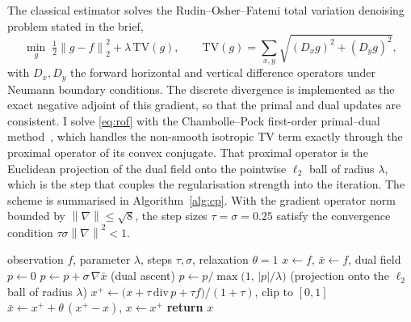 \documentclass[11pt,a4paper]{article}
\newcommand{\norm}[1]{\left\lVert #1 \right\rVert}
\begin{document}
The classical estimator solves the Rudin--Osher--Fatemi total variation
denoising problem stated in the brief,
\begin{equation}
  \min_{g}\; \tfrac12\norm{g-f}_2^2 + \lambda\,\mathrm{TV}(g),
  \qquad
  \mathrm{TV}(g)=\sum_{x,y}\sqrt{(D_xg)^2+(D_yg)^2},
  \label{eq:rof}
\end{equation}
with \(D_x,D_y\) the forward horizontal and vertical difference operators under
Neumann boundary conditions. The discrete divergence is implemented as the
exact negative adjoint of this gradient, so that the primal and dual updates are
consistent. I solve \eqref{eq:rof} with the Chambolle--Pock first-order
primal--dual method~\cite{chambollepock}, which handles the non-smooth isotropic
TV term exactly through the proximal operator of its convex conjugate. That
proximal operator is the Euclidean projection of the dual field onto the
pointwise \(\ell_2\) ball of radius \(\lambda\), which is the step that couples
the regularisation strength into the iteration. The scheme is summarised in
Algorithm~\ref{alg:cp}. With the gradient operator norm bounded by
\(\norm{\nabla}\le\sqrt{8}\), the step sizes \(\tau=\sigma=0.25\) satisfy the
convergence condition \(\tau\sigma\norm{\nabla}^2<1\).

\begin{algorithm}[H]
\caption{Chambolle--Pock TV denoising for problem~\eqref{eq:rof}}
\label{alg:cp}
\begin{algorithmic}[1]
\REQUIRE observation \(f\), parameter \(\lambda\), steps \(\tau,\sigma\), relaxation \(\theta=1\)
\STATE \(x \leftarrow f\), \quad \(\bar x \leftarrow f\), \quad dual field \(p \leftarrow 0\)
  \STATE \(p \leftarrow p + \sigma\,\nabla \bar x\) \hfill (dual ascent)
  \STATE \(p \leftarrow p / \max\!\big(1,\, |p|/\lambda\big)\) \hfill (projection onto the \(\ell_2\) ball of radius \(\lambda\))
  \STATE \(x^{+} \leftarrow \big(x + \tau\,\mathrm{div}\,p + \tau f\big)/(1+\tau)\), \quad clip to \([0,1]\)
  \STATE \(\bar x \leftarrow x^{+} + \theta\,(x^{+}-x)\), \quad \(x \leftarrow x^{+}\)
\ENDFOR
\STATE \textbf{return} \(x\)
\end{algorithmic}
\end{algorithm}
\end{document}
